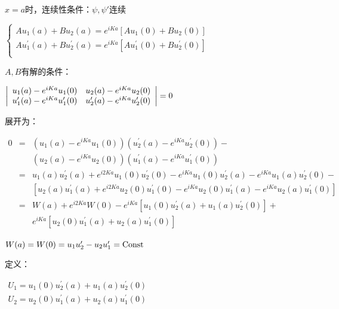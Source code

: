 $x = a$时，连续性条件：$\psi ,\psi '$连续

$\left\{ \begin{array}{l}
 Au_1 \left( a \right) + Bu_2 \left( a \right) = e^{iKa} \left[ {Au_1 \left( 0 \right) + Bu_2 \left( 0 \right)} \right] \\
 Au_1 ^\prime  \left( a \right) + Bu_2 ^\prime  \left( a \right) = e^{iKa} \left[ {Au_1 ^\prime  \left( 0 \right) + Bu_2 ^\prime  \left( 0 \right)} \right] \\
 \end{array} \right.$

$A, B$有解的条件：

$\left| {\begin{array}{*{20}c}
   {u_1 (a) - e^{iKa} u_1 (0)} & {u_2 (a) - e^{iKa} u_2 (0)}  \\
   {u_1 ^\prime  (a) - e^{iKa} u_1 ^\prime  (0)} & {u_2 ^\prime  (a) - e^{iKa} u_2 ^\prime  (0)}  \\
\end{array}} \right| = 0$

展开为：

\begin{eqnarray*}
0 & = & \left( {u_1 (a) - e^{iKa} u_1 (0)} \right)\left( {u_2 ^\prime  (a) - e^{iKa} u_2 ^\prime  (0)} \right) - \\
{} & {} & \left( {u_2 (a) - e^{iKa} u_2 (0)} \right)\left( {u_1 ^\prime  (a) - e^{iKa} u_1 ^\prime  (0)} \right) \\
{} & = & u_1 (a)u_2 ^\prime  (a) + e^{i2Ka} u_1 (0)u_2 ^\prime  (0) - e^{iKa} u_1 (0)u_2 ^\prime  (a) - e^{iKa} u_1 (a)u_2 ^\prime  (0) -  \\
{} & {} &  \left[ {u_2 (a)u_1 ^\prime  (a) + e^{i2Ka} u_2 (0)u_1 ^\prime  (0) - e^{iKa} u_2 (0)u_1 ^\prime  (a) - e^{iKa} u_2 (a)u_1 ^\prime  (0)} \right] \\
{} & = & W(a) + e^{i2Ka} W(0) - e^{iKa} \left[ {u_1 (0)u_2 ^\prime  (a) + u_1 (a)u_2 ^\prime  (0)} \right] + \\
{} & {} & e^{iKa} \left[ {u_2 (0)u_1 ^\prime  (a) + u_2 (a)u_1 ^\prime  (0)} \right]
\end{eqnarray*}



$W(a) = W(0) = u_1 u_2 ^\prime   - u_2 u_1 ^\prime   = {\rm{Const}}$

定义：

$\begin{array}{l}
 U_1  = u_1 (0)u_2 ^\prime  (a) + u_1 (a)u_2 ^\prime  (0) \\
 U_2  = u_2 (0)u_1 ^\prime  (a) + u_2 (a)u_1 ^\prime  (0) \\
 \end{array}$

